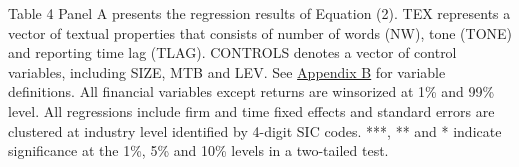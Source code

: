 \begin{table}[H]
\begin{footnotesize}
			\noindent Table 4 Panel A presents the regression results of Equation (2). TEX represents a vector of textual properties that consists of number of words (NW), tone (TONE) and reporting time lag (TLAG). CONTROLS denotes a vector of control variables, including SIZE, MTB and LEV. See \hyperref[appb]{Appendix B} for variable definitions. All financial variables except returns are winsorized at 1\% and 99\% level. All regressions include firm and time fixed effects and standard errors are clustered at industry level identified by 4-digit SIC codes. ***, ** and * indicate significance at the 1\%, 5\% and 10\% levels in a two-tailed test.
		\end{footnotesize}
\end{table}%